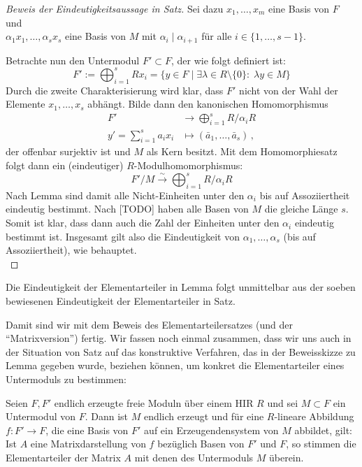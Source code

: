 \begin{proof}[Beweis der Eindeutigkeitsaussage in Satz] %
    Sei dazu $x_1,\ldots,x_m$ eine Basis von $F$ und\\
    $\alpha_1 x_1,\ldots,\alpha_s x_s$ eine Basis von $M$ mit
    $\alpha_i\mid\alpha_{i+1}$ für alle $i\in\{1,\ldots,s-1\}$.
    
    Betrachte nun den Untermodul $F'\subset F$, der wie folgt definiert ist:
    \[ F' := \bigoplus_{i=1}^s Rx_i 
        = \bigl\{ y\in F \;\big\vert\; \exists \lambda\in R\setminus\{0\}\colon
        \; \lambda y \in M \bigr\}  \]
    Durch die zweite Charakterisierung wird klar, dass $F'$ nicht von der Wahl
    der Elemente $x_1,\ldots,x_s$ abhängt.
    Bilde dann den kanonischen Homomorphismus
    \begin{align*}
        F' &\to \bigoplus_{i=1}^s R/\alpha_i R      \\
        y' = \sum_{i=1}^s a_ix_i &\mapsto (\bar{a}_1,\ldots,\bar{a}_s) \,,
    \end{align*}
    der offenbar surjektiv ist und $M$ als Kern besitzt. 
    Mit dem Homomorphiesatz %
    folgt dann ein (eindeutiger) $R$-Modulhomomorphismus:
    \[ F'/M \overset\sim\to \bigoplus_{i=1}^s R/\alpha_i R \]
    Nach Lemma %
    sind damit alle Nicht-Einheiten unter den $\alpha_i$ bis auf Assoziiertheit 
    eindeutig bestimmt. Nach [TODO] %
    haben alle Basen von $M$ die gleiche Länge $s$. Somit ist klar, dass dann
    auch die Zahl der Einheiten unter den $\alpha_i$ eindeutig bestimmt ist.
    Insgesamt gilt also die Eindeutigkeit von $\alpha_1,\ldots,\alpha_s$ (bis
    auf Assoziiertheit), wie behauptet.
    \\
\end{proof}

\begin{thKorollar} %
    Die Eindeutigkeit der Elementarteiler in Lemma %
    folgt unmittelbar aus der soeben bewiesenen Eindeutigkeit der
    Elementarteiler in Satz. %
\end{thKorollar}

Damit sind wir mit dem Beweis des Elementarteilersatzes (und der
\enquote{Matrixversion}) fertig. Wir fassen noch einmal zusammen, dass wir uns
auch in der Situation von Satz %
auf das konstruktive Verfahren, das in der Beweisskizze zu Lemma %
gegeben wurde, beziehen können, um konkret die Elementarteiler eines Untermoduls
zu bestimmen:

\begin{thKorollar}
    Seien $F,F'$ endlich erzeugte freie Moduln über einem HIR $R$ und sei
    $M\subset F$ ein Untermodul von $F$. Dann ist $M$ endlich erzeugt und für
    eine $R$-lineare Abbildung $f\colon F'\to F$, die eine Basis von $F'$ auf
    ein Erzeugendensystem von $M$ abbildet, gilt: Ist $A$ eine Matrixdarstellung
    von $f$ bezüglich Basen von $F'$ und $F$, so stimmen die Elementarteiler der
    Matrix $A$ mit denen des Untermoduls $M$ überein.
\end{thKorollar}








